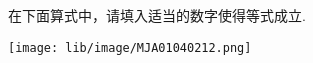 在下面算式中，请填入适当的数字使得等式成立. \\
\begin{center}
	\texttt{[image: lib/image/MJA01040212.png]}
	\vspace{0.5cm}
\end{center}